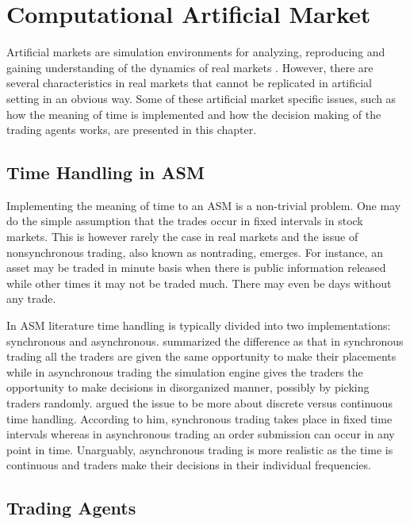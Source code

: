 \section{Computational Artificial Market}
Artificial markets are simulation environments for analyzing, 
reproducing and gaining understanding of the dynamics of 
real markets \citet{Julien07}. However, there are several 
characteristics in real markets that cannot be replicated
in artificial setting in an obvious way. Some of these artificial
market specific issues, such as how the meaning of time is 
implemented and how the decision making of the trading agents
works, are presented in this chapter.


\subsection{Time Handling in ASM}

Implementing the meaning of time to an ASM is a non-trivial problem.
One may do the simple assumption that the trades occur in fixed
intervals in stock markets. This is however rarely the case in real markets
and the issue of nonsynchronous trading, also known as nontrading, emerges. 
For instance, an asset may be traded in minute basis when there is
public information released while other times it may not be traded much.
There may even be days without any trade. \citep{Econometrics} 

In ASM literature time handling is typically divided into two implementations:
synchronous and asynchronous. \citet{Julien07} summarized the difference as that in synchronous
trading all the traders are given the same opportunity to make their placements
while in asynchronous trading the simulation engine gives the traders the opportunity to
make decisions in disorganized manner, possibly by picking traders randomly.
\citet{Ben17} argued the issue to be more about discrete versus continuous time handling.
According to him, synchronous trading takes place in fixed time intervals whereas in 
asynchronous trading an order submission can occur in any point in time. Unarguably, 
asynchronous trading is more realistic as the time is continuous and traders make
their decisions in their individual frequencies.


\subsection{Trading Agents}
\label{section:ASMTradingAgents}

